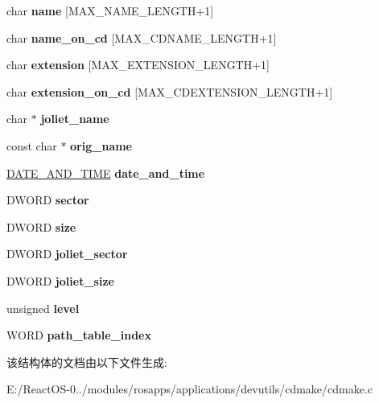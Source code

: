 \begin{DoxyCompactItemize}
char {\bfseries name} \mbox{[}M\+A\+X\+\_\+\+N\+A\+M\+E\+\_\+\+L\+E\+N\+G\+TH+1\mbox{]}
\item 
\mbox{\label{structdirectory__record_a8ec18c413b0882cc67ad5c40aea709c3}} 
char {\bfseries name\+\_\+on\+\_\+cd} \mbox{[}M\+A\+X\+\_\+\+C\+D\+N\+A\+M\+E\+\_\+\+L\+E\+N\+G\+TH+1\mbox{]}
\item 
\mbox{\label{structdirectory__record_ae4377b187bf7bdf8e6313a2b64e2ca93}} 
char {\bfseries extension} \mbox{[}M\+A\+X\+\_\+\+E\+X\+T\+E\+N\+S\+I\+O\+N\+\_\+\+L\+E\+N\+G\+TH+1\mbox{]}
\item 
\mbox{\label{structdirectory__record_af91b6a56376210c5c8c0d0f8da9023ec}} 
char {\bfseries extension\+\_\+on\+\_\+cd} \mbox{[}M\+A\+X\+\_\+\+C\+D\+E\+X\+T\+E\+N\+S\+I\+O\+N\+\_\+\+L\+E\+N\+G\+TH+1\mbox{]}
\item 
\mbox{\label{structdirectory__record_ac6b7e2b106ab0f1833d4a4a56605e6a2}} 
char $\ast$ {\bfseries joliet\+\_\+name}
\item 
\mbox{\label{structdirectory__record_af19838363e6bc82f6c49be91082835bf}} 
const char $\ast$ {\bfseries orig\+\_\+name}
\item 
\mbox{\label{structdirectory__record_a1ec87539ae3c96829b575b2c5939d9a1}} 
\hyperlink{structdate__and__time}{D\+A\+T\+E\+\_\+\+A\+N\+D\+\_\+\+T\+I\+ME} {\bfseries date\+\_\+and\+\_\+time}
\item 
\mbox{\label{structdirectory__record_a0556ab3de82c6b243ce8aeec38a311b7}} 
D\+W\+O\+RD {\bfseries sector}
\item 
\mbox{\label{structdirectory__record_aa342acf14956049855df3bc12a59a9b4}} 
D\+W\+O\+RD {\bfseries size}
\item 
\mbox{\label{structdirectory__record_ad3873e6502e054a4bedcf5783fe5984f}} 
D\+W\+O\+RD {\bfseries joliet\+\_\+sector}
\item 
\mbox{\label{structdirectory__record_ad7421f1176c1dbdd1674f764319ab970}} 
D\+W\+O\+RD {\bfseries joliet\+\_\+size}
\item 
\mbox{\label{structdirectory__record_a12798b505ab100d59188a0036ebc1e75}} 
unsigned {\bfseries level}
\item 
\mbox{\label{structdirectory__record_a61a5a6e44412524893468d214b9e25f5}} 
W\+O\+RD {\bfseries path\+\_\+table\+\_\+index}
\end{DoxyCompactItemize}


该结构体的文档由以下文件生成\+:\begin{DoxyCompactItemize}
\item 
E\+:/\+React\+O\+S-\/0../modules/rosapps/applications/devutils/cdmake/cdmake.\+c\end{DoxyCompactItemize}
